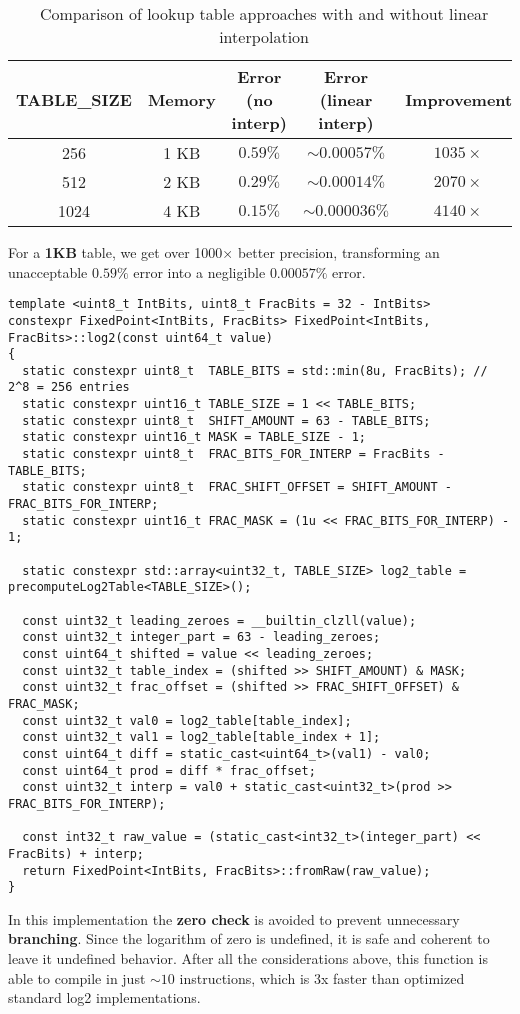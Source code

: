 \documentclass[11pt]{article}
\begin{document}
\begin{table}[h]
\centering
\begin{tabular}{|c|c|c|c|c|}
\hline
\textbf{TABLE\_SIZE} & \textbf{Memory} & \textbf{Error (no interp)} & \textbf{Error (linear interp)} & \textbf{Improvement} \\
\hline
256  & 1 KB & $0.59\%$ & $\sim 0.00057\%$  & $1035\times$ \\
512  & 2 KB & $0.29\%$ & $\sim 0.00014\%$  & $2070\times$ \\
1024 & 4 KB & $0.15\%$ & $\sim 0.000036\%$ & $4140\times$ \\
\hline
\end{tabular}
\caption{Comparison of lookup table approaches with and without linear interpolation}
\end{table}
For a \textbf{1KB} table, we get over 1000× better precision, transforming an unacceptable $0.59\%$ error into a negligible $0.00057\%$ error.

\newpage
\begin{verbatim}
template <uint8_t IntBits, uint8_t FracBits = 32 - IntBits>
constexpr FixedPoint<IntBits, FracBits> FixedPoint<IntBits, FracBits>::log2(const uint64_t value)
{
  static constexpr uint8_t  TABLE_BITS = std::min(8u, FracBits); // 2^8 = 256 entries
  static constexpr uint16_t TABLE_SIZE = 1 << TABLE_BITS;
  static constexpr uint8_t  SHIFT_AMOUNT = 63 - TABLE_BITS;
  static constexpr uint16_t MASK = TABLE_SIZE - 1;
  static constexpr uint8_t  FRAC_BITS_FOR_INTERP = FracBits - TABLE_BITS;
  static constexpr uint8_t  FRAC_SHIFT_OFFSET = SHIFT_AMOUNT - FRAC_BITS_FOR_INTERP;
  static constexpr uint16_t FRAC_MASK = (1u << FRAC_BITS_FOR_INTERP) - 1;

  static constexpr std::array<uint32_t, TABLE_SIZE> log2_table = precomputeLog2Table<TABLE_SIZE>();

  const uint32_t leading_zeroes = __builtin_clzll(value);
  const uint32_t integer_part = 63 - leading_zeroes;
  const uint64_t shifted = value << leading_zeroes;
  const uint32_t table_index = (shifted >> SHIFT_AMOUNT) & MASK;
  const uint32_t frac_offset = (shifted >> FRAC_SHIFT_OFFSET) & FRAC_MASK;
  const uint32_t val0 = log2_table[table_index];
  const uint32_t val1 = log2_table[table_index + 1];
  const uint64_t diff = static_cast<uint64_t>(val1) - val0;
  const uint64_t prod = diff * frac_offset;
  const uint32_t interp = val0 + static_cast<uint32_t>(prod >> FRAC_BITS_FOR_INTERP);

  const int32_t raw_value = (static_cast<int32_t>(integer_part) << FracBits) + interp;
  return FixedPoint<IntBits, FracBits>::fromRaw(raw_value);
}
\end{verbatim}
In this implementation the \textbf{zero check} is avoided to prevent unnecessary \textbf{branching}. Since the logarithm of zero is undefined, it is safe and coherent to leave it undefined behavior. After all the considerations above, this function is able to compile in just $\sim{10}$ instructions, which is 3x faster than optimized standard log2 implementations\textsuperscript{\cite{libc_log2}}.
\end{document}
